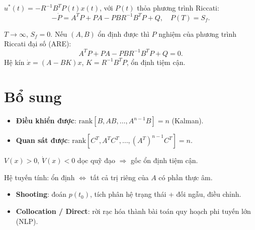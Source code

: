 \documentclass[12pt,a4paper]{article}
\begin{document}
\begin{dinhly}[title={Nghiệm LQR hữu hạn}]
  $u^*(t) = -R^{-1}B^T P(t)x(t)$, với $P(t)$ thỏa phương trình Riccati:
  \[
    -\dot{P} = A^T P + PA - PBR^{-1}B^T P + Q, \quad P(T) = S_f.
  \]
\end{dinhly}

\begin{dinhly}[title={LQR vô hạn (steady-state)}]
  $T \to \infty$, $S_f = 0$. Nếu $(A, B)$ ổn định được thì $P$ nghiệm của phương trình Riccati đại số (ARE):
  \[
    A^T P + PA - PBR^{-1}B^T P + Q = 0.
  \]
  Hệ kín $\dot{x} = (A - BK)x$, $K = R^{-1}B^T P$, ổn định tiệm cận.
\end{dinhly}

\section{Bổ sung}

\begin{tinhchat}[title={Điều khiển được và quan sát được}]
  \begin{itemize}
    \item \textbf{Điều khiển được}: $\text{rank}[B, AB, \ldots, A^{n-1}B] = n$ (Kalman).
    \item \textbf{Quan sát được}: $\text{rank}[C^T, A^TC^T, \ldots, (A^T)^{n-1}C^T] = n$.
  \end{itemize}
\end{tinhchat}

\begin{tinhchat}[title={Ổn định Lyapunov}]
  $V(x) > 0$, $\dot{V}(x) < 0$ dọc quỹ đạo $\Rightarrow$ gốc ổn định tiệm cận.

  Hệ tuyến tính: ổn định $\Leftrightarrow$ tất cả trị riêng của $A$ có phần thực âm.
\end{tinhchat}

\begin{phuongphap}[title={Giải số bài toán điều khiển}]
  \begin{itemize}
    \item \textbf{Shooting}: đoán $p(t_0)$, tích phân hệ trạng thái + đối ngẫu, điều chỉnh.
    \item \textbf{Collocation / Direct}: rời rạc hóa thành bài toán quy hoạch phi tuyến lớn (NLP).
  \end{itemize}
\end{phuongphap}
\end{document}
